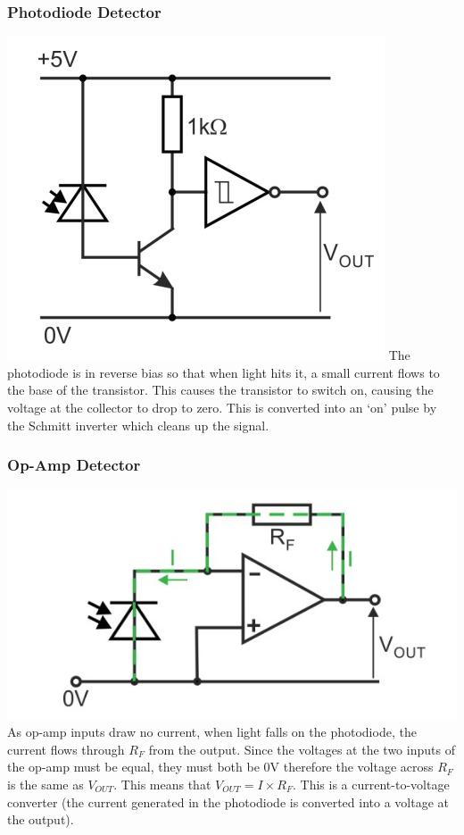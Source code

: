 \documentclass[a4paper,11pt, twocolumn]{article}
\begin{document}
\subsubsection{Photodiode Detector}
\includegraphics[width=\linewidth]{detectorPhotodiode.jpg}
The photodiode is in reverse bias so that when light hits it, a small current flows to the base of the transistor. This causes the transistor to switch on, causing the voltage at the collector to drop to zero. This is converted into an `on' pulse by the Schmitt inverter which cleans up the signal.
\subsubsection{Op-Amp Detector}
\includegraphics[width=\linewidth]{detectorOpAmp.jpg}
As op-amp inputs draw no current, when light falls on the photodiode, the current flows through $R_F$ from the output. Since the voltages at the two inputs of the op-amp must be equal, they must both be 0V therefore the voltage across $R_F$ is the same as $V_{OUT}$. This means that $V_{OUT} = I \times R_F$. This is a current-to-voltage converter (the current generated in the photodiode is converted into a voltage at the output).
\end{document}

